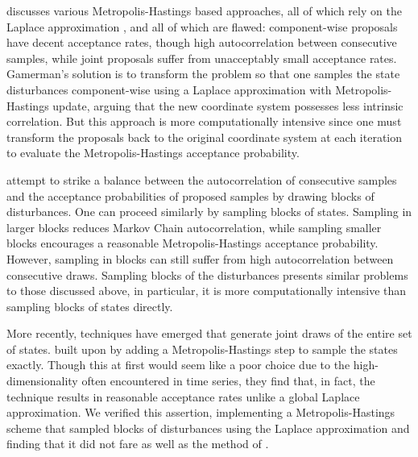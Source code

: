 \documentclass[12pt]{article}
\begin{document}
\cite{gamerman-1998} discusses various Metropolis-Hastings based approaches, all
of which rely on the Laplace approximation \citep{robert-casella-2005-book}, and
all of which are flawed: component-wise proposals have decent acceptance rates,
though high autocorrelation between consecutive samples, while joint proposals
suffer from unacceptably small acceptance rates.  Gamerman's solution is to
transform the problem so that one samples the state disturbances
component-wise using a Laplace approximation with Metropolis-Hastings update,
arguing that the new coordinate system possesses less intrinsic correlation.
But this approach is more computationally intensive since one must transform the
proposals back to the original coordinate system at each iteration to evaluate
the Metropolis-Hastings acceptance probability.

\cite{shephard-pitt-1997} attempt to strike a balance between the
autocorrelation of consecutive samples and the acceptance probabilities of
proposed samples by drawing blocks of disturbances.  One can proceed similarly
by sampling blocks of states.  Sampling in larger blocks reduces Markov Chain
autocorrelation, while sampling smaller blocks encourages a reasonable
Metropolis-Hastings acceptance probability.  However, sampling in blocks can
still suffer from high autocorrelation between consecutive draws.  Sampling
blocks of the disturbances presents similar problems to those discussed above,
in particular, it is more computationally intensive than sampling blocks of
states directly.

More recently, techniques have emerged that generate joint draws of the entire
set of states.  \cite{ravines-etal-2006} built upon \cite{west-etal-1985} by
adding a Metropolis-Hastings step to sample the states exactly.  Though this at
first would seem like a poor choice due to the high-dimensionality often
encountered in time series, they find that, in fact, the technique results in
reasonable acceptance rates unlike a global Laplace approximation.  We verified
this assertion, implementing a Metropolis-Hastings scheme that sampled blocks of
disturbances using the Laplace approximation and finding that it did not fare as
well as the method of \cite{ravines-etal-2006}.
\end{document}
